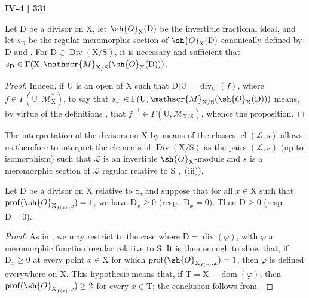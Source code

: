 \begin{proposition}[21.15.5]
\label{IV.21.15.5}
\par\noindent\hfill{\footnotesize\textbf{IV-4 | 331}}\par
Let $\mathrm{D}$ be a divisor on $\mathrm{X}$, let $\sh{O}_{\mathrm{X}}(\mathrm{D})$ be the invertible fractional ideal, and let $s_{\mathrm{D}}$ be the regular meromorphic section of $\sh{O}_{\mathrm{X}}(\mathrm{D})$ canonically defined by $\mathrm{D}$  and .
For $\mathrm{D}\in\operatorname{Div}(\mathrm{X}/\mathrm{S})$, it is necessary and sufficient that $s_{\mathrm{D}}\in\Gamma(\mathrm{X},\mathscr{M}_{\mathrm{X}/\mathrm{S}}(\sh{O}_{\mathrm{X}}(\mathrm{D})))$.
\end{proposition}

\begin{proof}
Indeed, if $\mathrm{U}$ is an open of $\mathrm{X}$ such that $\mathrm{D}|\mathrm{U}=\operatorname{div}_{\mathrm{U}}(f)$, where $f\in\Gamma(\mathrm{U},\mathscr{M}_{\mathrm{X}}^*)$, to say that $s_{\mathrm{D}}\in\Gamma(\mathrm{U},\mathscr{M}_{\mathrm{X}/\mathrm{S}}(\sh{O}_{\mathrm{X}}(\mathrm{D})))$ means, by virtue of the definitions , that $f^{-1}\in\Gamma(\mathrm{U},\mathscr{M}_{\mathrm{X}/\mathrm{S}})$, whence the proposition.
\end{proof}

The interpretation of the divisors on $\mathrm{X}$ by means of the classes $\operatorname{cl}(\mathscr{L},s)$  allows us therefore to interpret the elements of $\operatorname{Div}(\mathrm{X}/\mathrm{S})$ as the pairs $(\mathscr{L},s)$ (up to isomorphism) such that $\mathscr{L}$ is an invertible $\sh{O}_{\mathrm{X}}$-module and $s$ is a meromorphic section of $\mathscr{L}$ regular relative to $\mathrm{S}$ ,~(iii)).

\begin{proposition}[21.15.6]
\label{IV.21.15.6}
Let $\mathrm{D}$ be a divisor on $\mathrm{X}$ relative to $\mathrm{S}$, and suppose that for all $x\in\mathrm{X}$ such that $\operatorname{prof}(\sh{O}_{\mathrm{X}_{f(x)},x})=1$, we have $\mathrm{D}_x\geq 0$ (resp.\ $\mathrm{D}_x=0$).
Then $\mathrm{D}\geq 0$ (resp.\ $\mathrm{D}=0$).
\end{proposition}

\begin{proof}
As in , we may restrict to the case where $\mathrm{D}=\operatorname{div}(\varphi)$, with $\varphi$ a meromorphic function regular relative to $\mathrm{S}$. It is then enough to show that, if $\mathrm{D}_x\geq0$ at every point $x\in\mathrm{X}$ for which $\operatorname{prof}(\sh{O}_{\mathrm{X}_{f(x)},x})=1$, then $\varphi$ is defined everywhere on $\mathrm{X}$.
This hypothesis means that, if $\mathrm{T}=\mathrm{X}-\operatorname{dom}(\varphi)$, then $\operatorname{prof}(\sh{O}_{\mathrm{X}_{f(x)},x})\geq2$ for every $x\in\mathrm{T}$; the conclusion follows from .
\end{proof}

